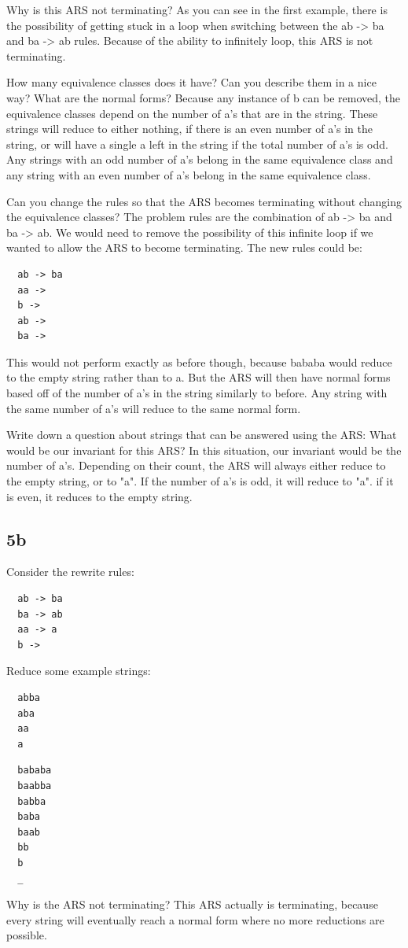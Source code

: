 \documentclass{article}
\theoremstyle{theorem}
\theoremstyle{definition}
\theoremstyle{remark}
\begin{document}
Why is this ARS not terminating?
As you can see in the first example, there is the possibility 
of getting stuck in a loop when switching between the ab -> ba 
and ba -> ab rules. Because of the ability to infinitely loop, this
ARS is not terminating. 

How many equivalence classes does it have? Can you describe them in a nice way? What are the normal forms?
Because any instance of b can be removed, the equivalence classes 
depend on the number of a's that are in the string. These strings will 
reduce to either nothing, if there is an even number of a's in the string, or will have a single a 
left in the string if the total number of a's is odd. Any strings with an odd number of a's belong 
in the same equivalence class and any string with an even number of a's belong in the 
same equivalence class. 

Can you change the rules so that the ARS becomes terminating without 
changing the equivalence classes?
The problem rules are the combination of ab -> ba and ba -> ab. We would 
need to remove the possibility of this infinite loop if we wanted to allow 
the ARS to become terminating. The new rules could be:
\begin{verbatim}
  ab -> ba
  aa -> 
  b -> 
  ab ->
  ba ->
\end{verbatim}
This would not perform exactly as before though, because bababa would reduce 
to the empty string rather than to a. But the ARS will then have normal forms based off
of the number of a's in the string similarly to before. Any string with the same 
number of a's will reduce to the same normal form.

Write down a question about strings that can be answered using the ARS:
What would be our invariant for this ARS?
In this situation, our invariant would be the number of a's. Depending on their count, the
ARS will always either reduce to the empty string, or to "a".
If the number of a's is odd, it will reduce to "a". if it is even,
it reduces to the empty string.

\subsection{5b}
Consider the rewrite rules:
\begin{verbatim}
  ab -> ba
  ba -> ab
  aa -> a
  b ->
\end{verbatim}
Reduce some example strings:
\begin{verbatim}
  abba
  aba 
  aa 
  a
\end{verbatim}
\begin{verbatim}
  bababa
  baabba 
  babba 
  baba 
  baab 
  bb 
  b 
  _
\end{verbatim}
Why is the ARS not terminating?
This ARS actually is terminating, because every string will eventually 
reach a normal form where no more reductions are possible. 
\end{document}
